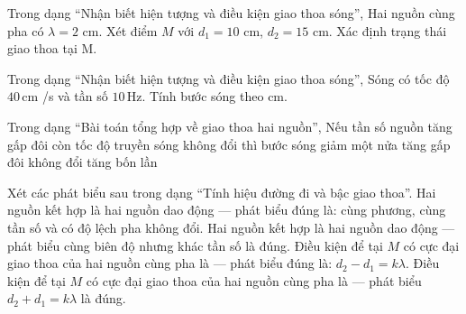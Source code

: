 \begin{ex}
Trong dạng “Nhận biết hiện tượng và điều kiện giao thoa sóng”, Hai nguồn cùng pha có $\lambda=2$ cm. Xét điểm $M$ với $d_1=10$ cm, $d_2=15$ cm. Xác định trạng thái giao thoa tại M.
\choiceTF

\end{ex}

\begin{ex}
Trong dạng “Nhận biết hiện tượng và điều kiện giao thoa sóng”, Sóng có tốc độ $40\,\text{cm}$ /s và tần số $10\,\text{Hz}$. Tính bước sóng theo cm.
\end{ex}

\begin{ex}
Trong dạng “Bài toán tổng hợp về giao thoa hai nguồn”, Nếu tần số nguồn tăng gấp đôi còn tốc độ truyền sóng không đổi thì bước sóng
\choice
{\True giảm một nửa}
{tăng gấp đôi}
{không đổi}
{tăng bốn lần}
\end{ex}

\begin{ex}
Xét các phát biểu sau trong dạng “Tính hiệu đường đi và bậc giao thoa”.
\choiceTF
{\True Hai nguồn kết hợp là hai nguồn dao động — phát biểu đúng là: cùng phương, cùng tần số và có độ lệch pha không đổi.}
{Hai nguồn kết hợp là hai nguồn dao động — phát biểu cùng biên độ nhưng khác tần số là đúng.}
{\True Điều kiện để tại $M$ có cực đại giao thoa của hai nguồn cùng pha là — phát biểu đúng là: $d_2-d_1=k\lambda$.}
{Điều kiện để tại $M$ có cực đại giao thoa của hai nguồn cùng pha là — phát biểu $d_2+d_1=k\lambda$ là đúng.}
\end{ex}

